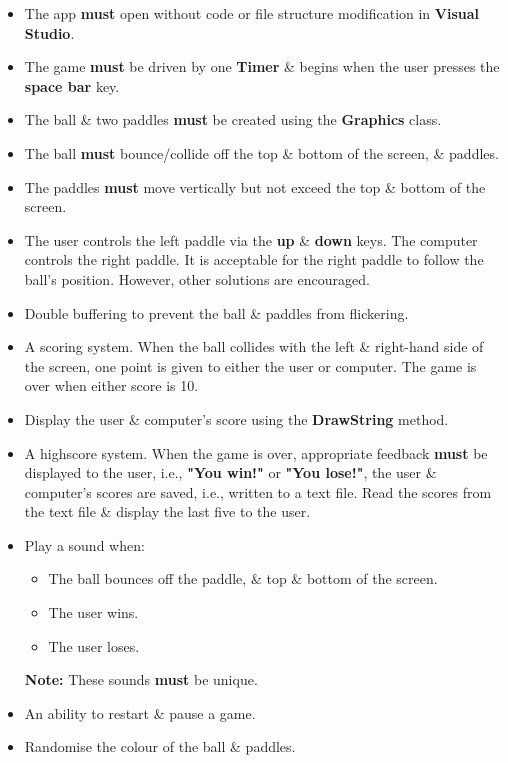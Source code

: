 \documentclass{article}
\begin{document}
\begin{itemize}
    \item The app \textbf{must} open without code or file structure modification in \textbf{Visual Studio}.
    \item The game \textbf{must} be driven by one \textbf{Timer} \& begins when the user presses the \textbf{space bar} key.
    \item The ball \& two paddles \textbf{must} be created using the \textbf{Graphics} class. 
    \item The ball \textbf{must} bounce/collide off the top \& bottom of the screen, \& paddles.
    \item The paddles \textbf{must} move vertically but not exceed the top \& bottom of the screen.
    \item The user controls the left paddle via the \textbf{up} \& \textbf{down} keys. The computer controls the right paddle. It is acceptable for the right paddle to follow the ball's position. However, other solutions are encouraged.
    \item Double buffering to prevent the ball \& paddles from flickering.
    \item A scoring system. When the ball collides with the left \& right-hand side of the screen, one point is given to either the user or computer. The game is over when either score is 10. 
    \item Display the user \& computer's score using the \textbf{DrawString} method.
    \item A highscore system. When the game is over, appropriate feedback \textbf{must} be displayed to the user, i.e., \textbf{"You win!"} or \textbf{"You lose!"}, the user \& computer's scores are saved, i.e., written to a text file. Read the scores from the text file \& display the last five to the user.
    \item Play a sound when:
    \begin{itemize}
        \item The ball bounces off the paddle, \& top \& bottom of the screen.
        \item The user wins.
        \item The user loses.
    \end{itemize}
    \textbf{Note:} These sounds \textbf{must} be unique.
    \item An ability to restart \& pause a game.
    \item Randomise the colour of the ball \& paddles.
\end{itemize}
\end{document}
